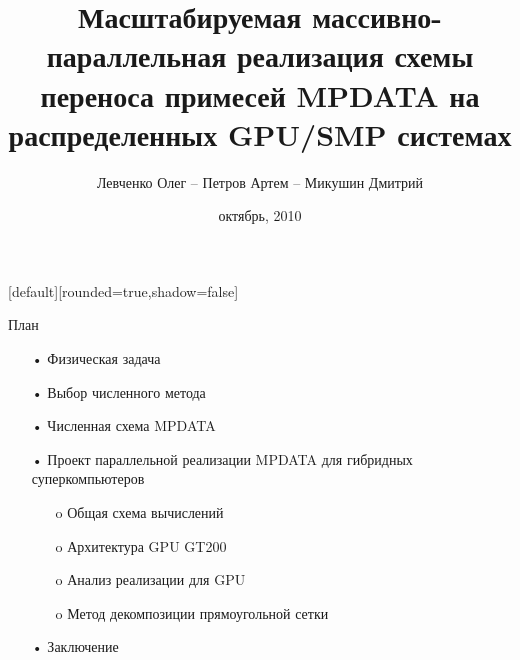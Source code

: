\documentclass[10pt]{beamer}
\title[Схема переноса MPDATA]{Масштабируемая массивно-параллельная реализация схемы переноса примесей MPDATA на распределенных GPU/SMP системах}
\author{Левченко Олег --  Петров Артем -- Микушин Дмитрий}
\institute{Геофизический Центр РАН -- СибНИГМИ РАН -- ИВМ РАН}
\date{октябрь, 2010}
\begin{document}
[default][rounded=true,shadow=false]

\begin{frame}
\titlepage
\end{frame}


\begin{frame}{План}
\begin{itemize}
\item[•] Физическая задача
\item[•] Выбор численного метода
\item[•] Численная схема MPDATA
\item[•] Проект параллельной реализации MPDATA для гибридных суперкомпьютеров
\begin{itemize}
\item[o] Общая схема вычислений
\item[o] Архитектура GPU GT200
\item[o] Анализ реализации для GPU
\item[o] Метод декомпозиции прямоугольной сетки
\end{itemize}
\item[•] Заключение
\end{itemize}
\end{frame}
\end{document}
